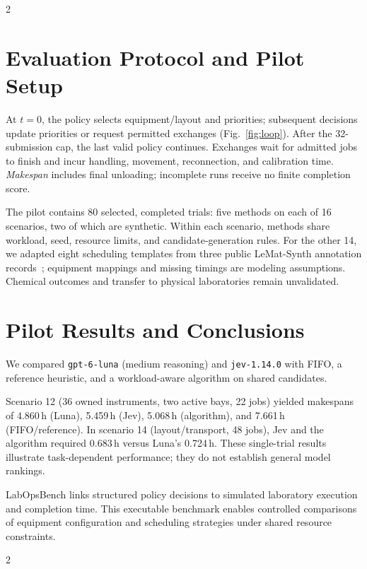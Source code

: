 \documentclass[10pt,a4paper]{article}
\begin{document}
\par\vspace{3mm}
\noindent\begin{minipage}{\textwidth}
\centering

\label{fig:loop}
\end{minipage}
\par\vspace{4.7mm}

\begin{multicols}{2}
\section{Evaluation Protocol and Pilot Setup}
At $t=0$, the policy selects equipment/layout and priorities; subsequent decisions update priorities or request permitted exchanges (Fig.~\ref{fig:loop}).
After the 32-submission cap, the last valid policy continues.
Exchanges wait for admitted jobs to finish and incur handling, movement, reconnection, and calibration time.
\emph{Makespan} includes final unloading; incomplete runs receive no finite completion score.

The pilot contains 80 selected, completed trials: five methods on each of 16 scenarios, two of which are synthetic.
Within each scenario, methods share workload, seed, resource limits, and candidate-generation rules.
For the other 14, we adapted eight scheduling templates from three public LeMat-Synth annotation records~\cite{lederbauer2026,lematannotations}; equipment mappings and missing timings are modeling assumptions.
Chemical outcomes and transfer to physical laboratories remain unvalidated.
\columnbreak
\section{Pilot Results and Conclusions}
We compared \texttt{gpt-6-luna} (medium reasoning) and \texttt{jev-1.14.0} with FIFO, a reference heuristic, and a workload-aware algorithm on shared candidates.

Scenario 12 (36 owned instruments, two active bays, 22 jobs) yielded makespans of 4.860\,h (Luna), 5.459\,h (Jev), 5.068\,h (algorithm), and 7.661\,h (FIFO/reference).
In scenario 14 (layout/transport, 48 jobs), Jev and the algorithm required 0.683\,h versus Luna's 0.724\,h.
These single-trial results illustrate task-dependent performance; they do not establish general model rankings.

LabOpsBench links structured policy decisions to simulated laboratory execution and completion time.
This executable benchmark enables controlled comparisons of equipment configuration and scheduling strategies under shared resource constraints.
\end{multicols}

\par\vspace{3pt}
\par
\vspace{-2pt}
\begin{multicols}{2}
\printbibliography[heading=none]
\end{multicols}
\end{document}
